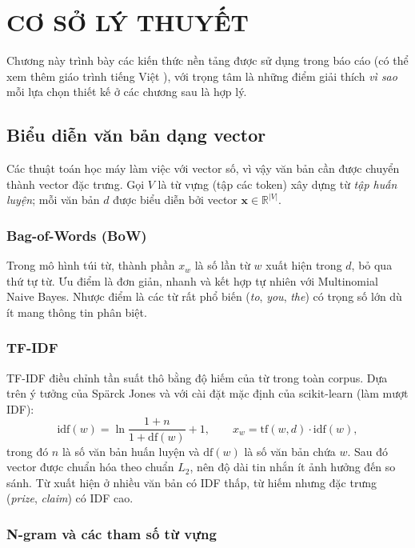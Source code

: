 \chapter{CƠ SỞ LÝ THUYẾT}

Chương này trình bày các kiến thức nền tảng được sử dụng trong báo cáo (có thể xem thêm giáo trình tiếng Việt \cite{tiep2018}), với trọng tâm là những điểm giải thích \textit{vì sao} mỗi lựa chọn thiết kế ở các chương sau là hợp lý.

\section{Biểu diễn văn bản dạng vector}

Các thuật toán học máy làm việc với vector số, vì vậy văn bản cần được chuyển thành vector đặc trưng. Gọi $V$ là từ vựng (tập các token) xây dựng từ \textit{tập huấn luyện}; mỗi văn bản $d$ được biểu diễn bởi vector $\mathbf{x}\in\mathbb{R}^{|V|}$.

\subsection{Bag-of-Words (BoW)}

Trong mô hình túi từ, thành phần $x_w$ là số lần từ $w$ xuất hiện trong $d$, bỏ qua thứ tự từ. Ưu điểm là đơn giản, nhanh và kết hợp tự nhiên với Multinomial Naive Bayes. Nhược điểm là các từ rất phổ biến (\textit{to}, \textit{you}, \textit{the}) có trọng số lớn dù ít mang thông tin phân biệt.

\subsection{TF-IDF}

TF-IDF điều chỉnh tần suất thô bằng độ hiếm của từ trong toàn corpus. Dựa trên ý tưởng của Spärck Jones \cite{sparckjones1972} và với cài đặt mặc định của scikit-learn \cite{scikit-learn} (làm mượt IDF):
\begin{equation}
\mathrm{idf}(w)=\ln\frac{1+n}{1+\mathrm{df}(w)}+1,\qquad
x_w=\mathrm{tf}(w,d)\cdot\mathrm{idf}(w),
\end{equation}
trong đó $n$ là số văn bản huấn luyện và $\mathrm{df}(w)$ là số văn bản chứa $w$. Sau đó vector được chuẩn hóa theo chuẩn $L_2$, nên độ dài tin nhắn ít ảnh hưởng đến so sánh. Từ xuất hiện ở nhiều văn bản có IDF thấp, từ hiếm nhưng đặc trưng (\textit{prize}, \textit{claim}) có IDF cao.

\subsection{N-gram và các tham số từ vựng}

